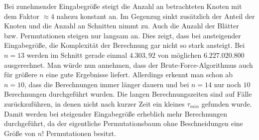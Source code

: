 \documentclass[german,version-2019-11]{uzl-thesis}
\begin{document}
\begin{table}[htpb]
\centering
{}
\caption{Beschneidungen im Permutationsbaum des Brute-Force-Algorithmus bei einer Eingabe von $1\leq n\leq 14$ Zielen}
\label{tab:ExpBF}
\end{table}
\noindent 
Bei zunehmender Eingabegröße steigt die Anzahl an betrachteten Knoten mit dem Faktor $\approx 4$ nahezu konstant an. Im Gegenzug sinkt zusätzlich der Anteil der Knoten und die Anzahl an Schnitten nimmt zu. Auch die Anzahl der Blätter bzw. Permutationen steigen nur langsam an. Dies zeigt, dass bei ansteigender Eingabegröße, die Komplexität der Berechnung gar nicht so stark ansteigt. Bei $n=13$ werden im Schnitt gerade einmal $4.303,92$ von möglichen $6.227.020.800$ ausgerechnet. Man würde nun annehmen, dass der Brute-Force-Algorithmus auch für größere $n$ eine gute Ergebnisse liefert. Allerdings erkennt man schon ab $n=10$, dass die Berechnungen immer länger dauern und bei $n=14$ nur noch $10$ Berechnungen durchgeführt wurden. Die langen Berechnungszeiten sind auf Fälle zurückzuführen, in denen nicht nach kurzer Zeit ein kleines $\tau_{min}$ gefunden wurde. Damit werden bei steigender Eingabegröße erheblich mehr Berechnungen durchgeführt, da der eigentliche Permutationsbaum ohne Beschneidungen eine Größe von $n!$ Permutationen besitzt.  \\
\end{document}
